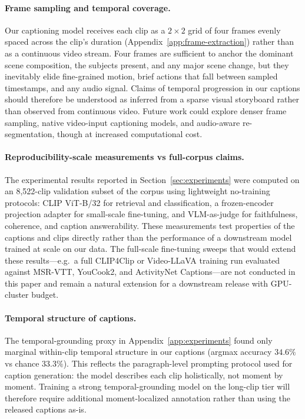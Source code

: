 \documentclass{article}
\begin{document}
\paragraph{Frame sampling and temporal coverage.}
Our captioning model receives each clip as a $2 \times 2$ grid of four frames evenly spaced across the clip's duration (Appendix~\ref{app:frame-extraction}) rather than as a continuous video stream. Four frames are sufficient to anchor the dominant scene composition, the subjects present, and any major scene change, but they inevitably elide fine-grained motion, brief actions that fall between sampled timestamps, and any audio signal. Claims of temporal progression in our captions should therefore be understood as inferred from a sparse visual storyboard rather than observed from continuous video. Future work could explore denser frame sampling, native video-input captioning models, and audio-aware re-segmentation, though at increased computational cost.

\paragraph{Reproducibility-scale measurements vs full-corpus claims.}
The experimental results reported in Section~\ref{sec:experiments} were computed on an 8{,}522-clip validation subset of the corpus using lightweight no-training protocols: CLIP ViT-B/32 for retrieval and classification, a frozen-encoder projection adapter for small-scale fine-tuning, and VLM-as-judge for faithfulness, coherence, and caption answerability. These measurements test properties of the captions and clips directly rather than the performance of a downstream model trained at scale on our data. The full-scale fine-tuning sweeps that would extend these results---e.g.~a full CLIP4Clip or Video-LLaVA training run evaluated against MSR-VTT, YouCook2, and ActivityNet Captions---are not conducted in this paper and remain a natural extension for a downstream release with GPU-cluster budget.

\paragraph{Temporal structure of captions.}
The temporal-grounding proxy in Appendix~\ref{app:experiments} found only marginal within-clip temporal structure in our captions (argmax accuracy $34.6\%$ vs chance $33.3\%$). This reflects the paragraph-level prompting protocol used for caption generation: the model describes each clip holistically, not moment by moment. Training a strong temporal-grounding model on the long-clip tier will therefore require additional moment-localized annotation rather than using the released captions as-is.
\end{document}
